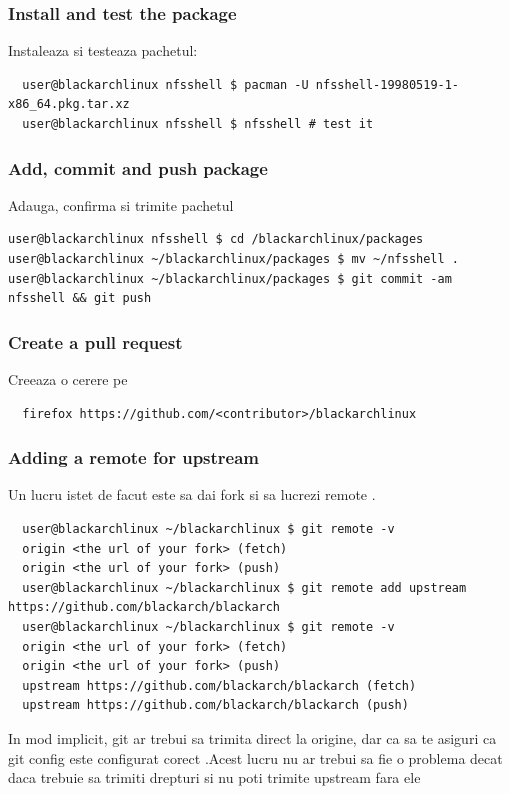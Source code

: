 \documentclass[a4paper, oneside, 11pt]{book}
\def\href#1#2{\htmladdnormallink{#2}{#1}}
\begin{document}
\subsubsection{Install and test the package}
Instaleaza si testeaza pachetul:
\begin{lstlisting}
  user@blackarchlinux nfsshell $ pacman -U nfsshell-19980519-1-x86_64.pkg.tar.xz
  user@blackarchlinux nfsshell $ nfsshell # test it
\end{lstlisting}

\subsubsection{Add, commit and push package}
Adauga, confirma si trimite pachetul
\begin{lstlisting}user@blackarchlinux nfsshell $ cd /blackarchlinux/packages
user@blackarchlinux ~/blackarchlinux/packages $ mv ~/nfsshell .
user@blackarchlinux ~/blackarchlinux/packages $ git commit -am nfsshell && git push
\end{lstlisting}

\subsubsection{Create a pull request}
Creeaza o cerere pe \href{https://github.com/}{github.com}
\begin{lstlisting}
  firefox https://github.com/<contributor>/blackarchlinux
\end{lstlisting}

\subsubsection{Adding a remote for upstream}
Un lucru istet de facut este sa dai fork si sa lucrezi remote .
\begin{lstlisting}
  user@blackarchlinux ~/blackarchlinux $ git remote -v
  origin <the url of your fork> (fetch)
  origin <the url of your fork> (push)
  user@blackarchlinux ~/blackarchlinux $ git remote add upstream https://github.com/blackarch/blackarch
  user@blackarchlinux ~/blackarchlinux $ git remote -v
  origin <the url of your fork> (fetch)
  origin <the url of your fork> (push)
  upstream https://github.com/blackarch/blackarch (fetch)
  upstream https://github.com/blackarch/blackarch (push)
\end{lstlisting}

In mod implicit, git ar trebui sa trimita direct la origine, dar ca sa te asiguri ca git config este configurat corect .Acest lucru nu ar trebui sa fie o problema decat daca trebuie sa trimiti drepturi si nu poti trimite upstream fara ele
\end{document}

